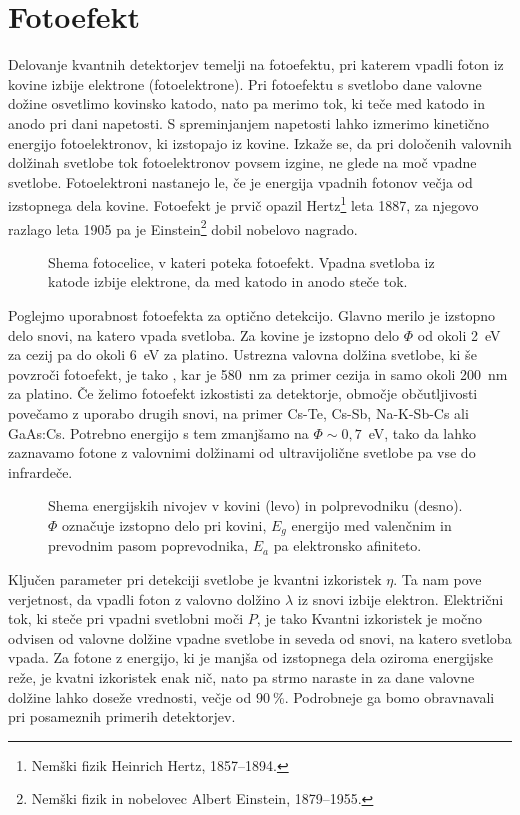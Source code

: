 \section{Fotoefekt}
Delovanje kvantnih detektorjev temelji na fotoefektu, pri katerem vpadli
foton iz kovine izbije elektrone (fotoelektrone). Pri fotoefektu s svetlobo
dane valovne dožine osvetlimo kovinsko katodo, nato pa merimo tok, ki teče med katodo
in anodo pri dani napetosti. S spreminjanjem napetosti lahko izmerimo kinetično 
energijo fotoelektronov, ki izstopajo iz kovine. Izkaže se, da pri določenih 
valovnih dolžinah svetlobe tok fotoelektronov povsem izgine, ne glede na moč vpadne svetlobe.
Fotoelektroni nastanejo le, če je energija vpadnih fotonov večja od izstopnega
dela kovine. Fotoefekt je prvič opazil Hertz\footnote{Nemški fizik Heinrich Hertz, 1857--1894.} 
leta 1887, za njegovo razlago leta
1905 pa je Einstein\footnote{Nemški fizik in nobelovec Albert Einstein, 1879--1955.} 
dobil nobelovo nagrado. 
\begin{figure}[h]
\centering
\def\svgwidth{60truemm} 

\caption{Shema fotocelice, v kateri poteka fotoefekt. 
Vpadna svetloba iz katode izbije elektrone, da med katodo in anodo steče tok.}
\label{fig:Fotoefekt}
\end{figure}

Poglejmo uporabnost fotoefekta za optično detekcijo. Glavno merilo je 
izstopno delo snovi, na katero vpada svetloba. Za kovine je izstopno delo $\Phi$
od okoli 2~eV za cezij pa do okoli 6~eV za platino. 
Ustrezna valovna dolžina svetlobe, ki še povzroči fotoefekt, je tako 
\beq
\lambda \leq {},
\eeq
kar je 580~nm za primer cezija in samo okoli 200~nm za platino. Če želimo fotoefekt
izkostisti za detektorje, območje občutljivosti povečamo z uporabo drugih snovi,
na primer Cs-Te, Cs-Sb, Na-K-Sb-Cs ali GaAs:Cs.
Potrebno energijo s tem zmanjšamo na $\Phi \sim 0,7$~eV, tako da lahko zaznavamo 
fotone z valovnimi dolžinami od ultravijolične svetlobe pa vse do infrardeče. 
\begin{figure}[h]
\centering
\def\svgwidth{100truemm} 

\caption{Shema energijskih nivojev v kovini (levo) in polprevodniku (desno). $\Phi$ označuje
izstopno delo pri kovini, $E_g$ energijo med valenčnim in prevodnim pasom poprevodnika,
$E_a$ pa elektronsko afiniteto. }
\label{fig:Nivoji}
\end{figure}

Ključen parameter pri detekciji svetlobe je kvantni izkoristek $\eta$.
Ta nam pove verjetnost, da vpadli foton z valovno dolžino $\lambda$ iz 
snovi izbije elektron. Električni tok, ki steče pri vpadni svetlobni moči $P$, je tako
Kvantni izkoristek je močno odvisen od valovne dolžine vpadne svetlobe in seveda
od snovi, na katero svetloba vpada. Za fotone z energijo, ki je manjša od izstopnega 
dela oziroma energijske reže, je kvatni izkoristek enak nič, nato pa strmo naraste in za
dane valovne dolžine lahko doseže vrednosti, večje od $90~\%$. Podrobneje ga bomo 
obravnavali pri posameznih primerih detektorjev.

